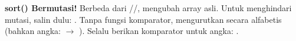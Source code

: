 \begin{catatan}
\textbf{sort() Bermutasi!} Berbeda dari //,  mengubah array asli. Untuk menghindari mutasi, salin dulu: . Tanpa fungsi komparator,  mengurutkan secara alfabetis (bahkan angka:  $\rightarrow$ \code{[1,10,2]}). Selalu berikan komparator untuk angka:  \cite{mdnJsGuide}.
\end{catatan}

